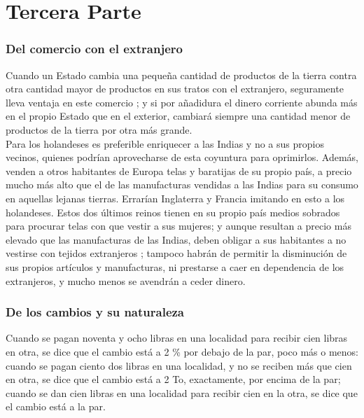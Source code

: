 \documentclass[10pt]{article}
\begin{document}
\part*{\center Tercera Parte}
\begin{multicols}{1}
\section*{Del comercio con el extranjero}
Cuando un Estado cambia una pequeña cantidad de productos de la tierra contra otra cantidad mayor de
productos en sus tratos con el extranjero, seguramente lleva ventaja en este comercio ; y si por añadidura el dinero corriente abunda más en el propio Estado que en el exterior, cambiará siempre una cantidad menor de productos de la tierra por otra más grande.\\
Para los holandeses es preferible enriquecer a las Indias y no a sus propios vecinos, quienes podrían aprovecharse de esta coyuntura para oprimirlos. Además, venden a otros habitantes de Europa telas y baratijas de su propio país, a precio mucho más alto que el de las manufacturas vendidas a las Indias para su consumo en aquellas lejanas tierras. Errarían Inglaterra y Francia imitando en esto a los holandeses. Estos dos últimos reinos tienen en su propio país medios sobrados para procurar telas con que vestir a sus mujeres; y aunque resultan a precio más elevado que las manufacturas de las Indias, deben obligar a sus habitantes a no vestirse con tejidos extranjeros ; tampoco habrán de permitir la disminución de sus propios artículos y manufacturas, ni prestarse a caer en dependencia de los extranjeros, y mucho menos se avendrán a ceder dinero.
\section*{De los cambios y su naturaleza}
Cuando se pagan noventa y ocho libras en una localidad para recibir cien libras en otra, se dice que el cambio está a 2 \% por debajo de la par, poco más o menos: cuando se pagan ciento dos libras en una localidad, y no se reciben más que cien en otra, se dice que el cambio está a 2 To, exactamente, por encima de la par; cuando se dan cien libras en una localidad para recibir cien en la otra, se dice que el cambio está a la par.

\end{multicols}
\end{document}
